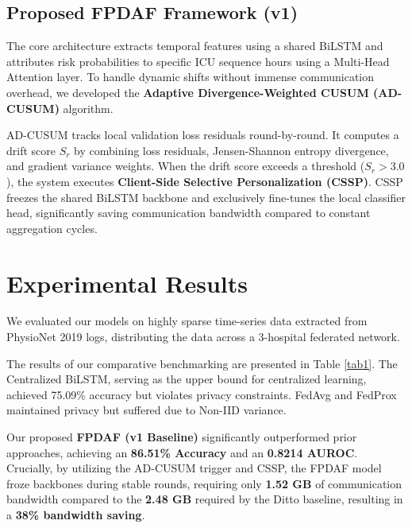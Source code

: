 \documentclass[conference]{IEEEtran}
\begin{document}
\subsection{Proposed FPDAF Framework (v1)}
The core architecture extracts temporal features using a shared BiLSTM and attributes risk probabilities to specific ICU sequence hours using a Multi-Head Attention layer. To handle dynamic shifts without immense communication overhead, we developed the \textbf{Adaptive Divergence-Weighted CUSUM (AD-CUSUM)} algorithm.

AD-CUSUM tracks local validation loss residuals round-by-round. It computes a drift score $S_r$ by combining loss residuals, Jensen-Shannon entropy divergence, and gradient variance weights. When the drift score exceeds a threshold ($S_r > 3.0$), the system executes \textbf{Client-Side Selective Personalization (CSSP)}. CSSP freezes the shared BiLSTM backbone and exclusively fine-tunes the local classifier head, significantly saving communication bandwidth compared to constant aggregation cycles.

\section{Experimental Results}

We evaluated our models on highly sparse time-series data extracted from PhysioNet 2019 logs, distributing the data across a 3-hospital federated network. 

The results of our comparative benchmarking are presented in Table \ref{tab1}. The Centralized BiLSTM, serving as the upper bound for centralized learning, achieved 75.09\% accuracy but violates privacy constraints. FedAvg and FedProx maintained privacy but suffered due to Non-IID variance. 

Our proposed \textbf{FPDAF (v1 Baseline)} significantly outperformed prior approaches, achieving an \textbf{86.51\% Accuracy} and an \textbf{0.8214 AUROC}. Crucially, by utilizing the AD-CUSUM trigger and CSSP, the FPDAF model froze backbones during stable rounds, requiring only \textbf{1.52 GB} of communication bandwidth compared to the \textbf{2.48 GB} required by the Ditto baseline, resulting in a \textbf{38\% bandwidth saving}.
\end{document}
